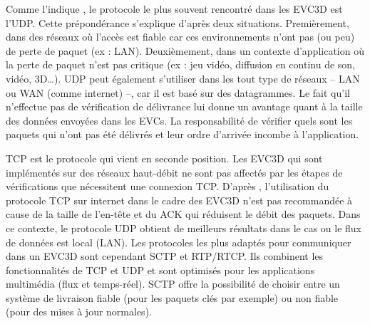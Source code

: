 Comme l'indique \cite{Roberto2014}, le protocole le plus souvent rencontré dans 
les \gls{EVC3D} est l'\gls{UDP}. 
Cette prépondérance s'explique d'après deux situations. Premièrement, dans des 
réseaux où l'accès est fiable car ces environnements n'ont 
pas (ou peu) de perte de paquet (ex : \gls{LAN}). Deuxièmement, dans un contexte 
d'application où la perte de paquet n'est pas critique (ex : jeu vidéo, diffusion en 
continu de son, vidéo, 3D\dots). 
\gls{UDP} peut également s'utiliser dans les tout type de réseaux -- \gls{LAN} ou 
\gls{WAN} (comme internet) --, car il est basé sur des datagrammes. Le fait qu'il 
n'effectue pas de vérification de délivrance lui donne un avantage quant 
à la taille des données envoyées dans les \glspl{EVC}. La responsabilité de 
vérifier quels sont les 
paquets qui n'ont pas été délivrés et leur ordre d'arrivée incombe à l'application.

\gls{TCP} est le protocole qui vient en seconde position. Les \gls{EVC3D} qui sont 
implémentés sur des réseaux haut-débit ne sont pas affectés par les étapes de 
vérifications que nécessitent une connexion \gls{TCP}. D'après \cite{Sung2006}, 
l'utilisation du protocole \gls{TCP} sur internet dans le cadre des \gls{EVC3D} n'est 
pas recommandée à cause de la taille de l'en-tête et du ACK qui réduisent le débit 
des paquets.
Dans ce contexte, le protocole \gls{UDP} obtient de meilleurs résultats dans le cas 
ou le flux de données est local (\gls{LAN}). 
Les protocoles les plus adaptés pour communiquer dans un \gls{EVC3D} sont 
cependant \acrshort{SCTP} et \gls{RTP}/\gls{RTCP}. Ils combinent les 
fonctionnalités de 
\gls{TCP} et \gls{UDP} et sont optimisés pour les applications multimédia (flux et 
temps-réel). \gls{SCTP} offre la possibilité de choisir entre un système de 
livraison fiable (pour les paquets clés par exemple) ou non fiable (pour des mises 
à jour normales).

